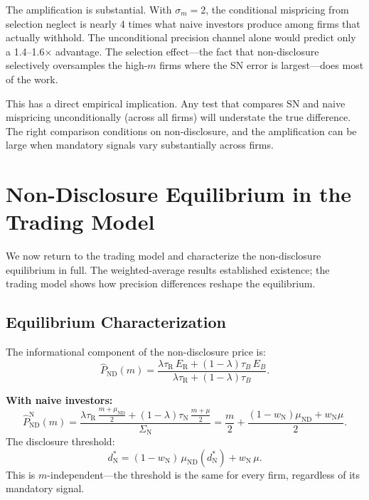 \documentclass[12pt]{article}
\theoremstyle{plain}
\theoremstyle{definition}
\newcommand{\ND}{\mathrm{ND}}
\newcommand{\R}{\mathrm{R}}
\newcommand{\N}{\mathrm{N}}
\begin{document}
The amplification is substantial. With $\sigma_m = 2$, the conditional mispricing from selection neglect is nearly 4 times what naive investors produce among firms that actually withhold. The unconditional precision channel alone would predict only a 1.4--1.6$\times$ advantage. The selection effect---the fact that non-disclosure selectively oversamples the high-$m$ firms where the SN error is largest---does most of the work.

This has a direct empirical implication. Any test that compares SN and naive mispricing unconditionally (across all firms) will understate the true difference. The right comparison conditions on non-disclosure, and the amplification can be large when mandatory signals vary substantially across firms.


\section{Non-Disclosure Equilibrium in the Trading Model}
\label{sec:nd_trading}

We now return to the trading model and characterize the non-disclosure equilibrium in full. The weighted-average results established existence; the trading model shows how precision differences reshape the equilibrium.

\subsection{Equilibrium Characterization}

The informational component of the non-disclosure price is:
\begin{equation}
\hat{P}_{\ND}(m) = \frac{\lambda\tau_\R\, E_\R + (1-\lambda)\tau_B\, E_B}{\lambda\tau_\R + (1-\lambda)\tau_B}.
\label{eq:info_nd}
\end{equation}

\textbf{With naive investors:}
\[
\hat{P}_{\ND}^\N(m) = \frac{\lambda\tau_\R\,\frac{m+\mu_{\ND}}{2} + (1-\lambda)\tau_\N\,\frac{m+\mu}{2}}{\Sigma_\N} = \frac{m}{2} + \frac{(1-w_\N)\mu_{\ND} + w_\N\mu}{2}.
\]
The disclosure threshold:
\begin{equation}
d^*_\N = (1-w_\N)\,\mu_{\ND}(d^*_\N) + w_\N\,\mu.
\label{eq:trading_threshold_naive}
\end{equation}
This is $m$-independent---the threshold is the same for every firm, regardless of its mandatory signal.
\end{document}
